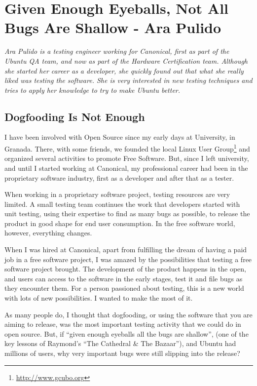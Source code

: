 \chapter{Given Enough Eyeballs, Not All Bugs Are Shallow - Ara Pulido}

\textit{Ara Pulido is a testing engineer working for Canonical, first as part of the Ubuntu QA team, and now as part of the Hardware Certification team. Although she started her career as a developer, she quickly found out that what she really liked was testing the software. She is very interested in new testing techniques and tries to apply her knowledge to try to make Ubuntu better.}

\section*{Dogfooding Is Not Enough} 

I have been involved with Open Source since my early days at University, in Granada. There, with some friends, we founded the local Linux User Group\footnote{\url{http://www.gcubo.org}} and organized several activities to promote Free Software. But, since I left university, and until I started working at Canonical, my professional career had been in the proprietary software industry, first as a developer and after that as a tester.

When working in a proprietary software project, testing resources are very limited. A small testing team continues the work that developers started with unit testing, using their expertise to find as many bugs as possible, to release the product in good shape for end user consumption. In the free software world, however, everything changes.

When I was hired at Canonical, apart from fulfilling the dream of having a paid job in a free software project, I was amazed by the possibilities that testing a free software project brought. The development of the product happens in the open, and users can access to the software in the early stages, test it and file bugs as they encounter them. For a person passioned about testing, this is a new world with lots of new possibilities. I wanted to make the most of it.

As many people do, I thought that dogfooding, or using the software that you are aiming to release, was the most important testing activity that we could do in open source. But, if ``given enough eyeballs all the bugs are shallow'', (one of the key lessons of Raymond's ``The Cathedral \& The Bazaar''), and Ubuntu had millions of users, why very important bugs were still slipping into the release?

